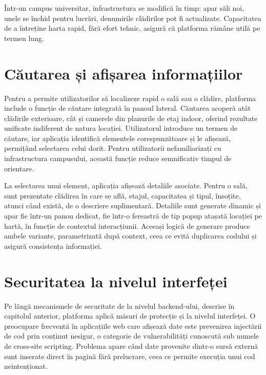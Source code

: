 Într-un campus universitar, infrastructura se modifică în timp: apar săli noi,
unele se închid pentru lucrări, denumirile clădirilor pot fi actualizate.
Capacitatea de a întreține harta rapid, fără efort tehnic, asigură că
platforma rămâne utilă pe termen lung.



\section{Căutarea și afișarea informațiilor}
\label{sec:cautare-impl}

Pentru a permite utilizatorilor să localizeze rapid o sală sau o clădire,
platforma include o funcție de căutare integrată în panoul lateral. Căutarea
acoperă atât clădirile exterioare, cât și camerele din planurile de etaj
indoor, oferind rezultate unificate indiferent de natura locației. Utilizatorul
introduce un termen de căutare, iar aplicația identifică elementele
corespunzătoare și le afișează, permițând selectarea celui dorit. Pentru
utilizatorii nefamiliarizați cu infrastructura campusului, această funcție
reduce semnificativ timpul de orientare.

La selectarea unui element, aplicația afișează detaliile asociate. Pentru o
sală, sunt prezentate clădirea în care se află, etajul, capacitatea și tipul,
însoțite, atunci când există, de o descriere suplimentară. Detaliile sunt
generate dinamic și apar fie într-un panou dedicat, fie într-o fereastră de
tip popup atașată locației pe hartă, în funcție de contextul interacțiunii.
Aceeași logică de generare produce ambele variante, parametrizată după
context, ceea ce evită duplicarea codului și asigură consistența informației.



\section{Securitatea la nivelul interfeței}
\label{sec:securitate-frontend-impl}
 
Pe lângă mecanismele de securitate de la nivelul backend-ului, descrise în
capitolul anterior, platforma aplică măsuri de protecție și la nivelul
interfeței. O preocupare frecventă în aplicațiile web care afișează date este
prevenirea injectării de cod prin conținut nesigur, o categorie de
vulnerabilități cunoscută sub numele de cross-site scripting. Problema apare
când date provenite dintr-o sursă externă sunt inserate direct în pagină fără
prelucrare, ceea ce permite execuția unui cod neintenționat.
 
